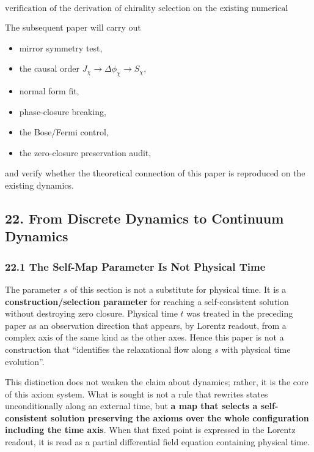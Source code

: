 \documentclass[
  a4paper,
]{article}
\providecommand{\tightlist}{%
  \setlength{\itemsep}{0pt}\setlength{\parskip}{0pt}}
\begin{document}
\[
\boxed{
\text{verification of the derivation of chirality selection on the existing numerical experimental system}
}
\tag{192}
\]

The subsequent paper will carry out

\begin{itemize}
\tightlist
\item
  mirror symmetry test,
\item
  the causal order \(J_\chi\to\Delta\phi_\chi\to S_\chi\),
\item
  normal form fit,
\item
  phase-closure breaking,
\item
  the Bose/Fermi control,
\item
  the zero-closure preservation audit,
\end{itemize}

and verify whether the theoretical connection of this paper is
reproduced on the existing dynamics.

\subsection{22. From Discrete Dynamics to Continuum
Dynamics}\label{from-discrete-dynamics-to-continuum-dynamics}

\subsubsection{22.1 The Self-Map Parameter Is Not Physical
Time}\label{the-self-map-parameter-is-not-physical-time}

The parameter \(s\) of this section is not a substitute for physical
time. It is a \textbf{construction/selection parameter} for reaching a
self-consistent solution without destroying zero closure. Physical time
\(t\) was treated in the preceding paper as an observation direction
that appears, by Lorentz readout, from a complex axis of the same kind
as the other axes. Hence this paper is not a construction that
``identifies the relaxational flow along \(s\) with physical time
evolution''.

This distinction does not weaken the claim about dynamics; rather, it is
the core of this axiom system. What is sought is not a rule that
rewrites states unconditionally along an external time, but \textbf{a
map that selects a self-consistent solution preserving the axioms over
the whole configuration including the time axis}. When that fixed point
is expressed in the Lorentz readout, it is read as a partial
differential field equation containing physical time.
\end{document}
